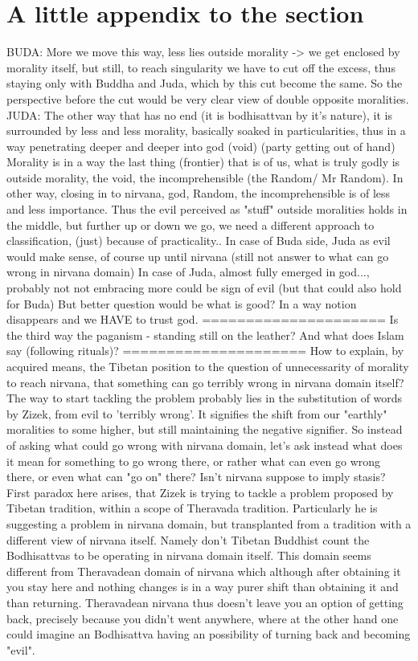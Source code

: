 \documentclass[10pt]{book}
\begin{document}
\section{A little appendix to the section}
BUDA: More we move this way, less lies outside morality -> we get enclosed by morality itself, but still, to reach singularity we have to cut off the excess, thus staying only with Buddha and Juda, which by this cut become the same. So the perspective before the cut would be very clear view of double opposite moralities.
JUDA: The other way that has no end (it is bodhisattvan by it's nature), it is surrounded by less and less morality, basically soaked in particularities, thus in a way penetrating deeper and deeper into god (void) (party getting out of hand)
Morality is in a way the last thing (frontier) that is of us, what is truly godly is outside morality, the void, the incomprehensible (the Random/ Mr Random). In other way, closing in to nirvana, god, Random, the incomprehensible is of less and less importance.
Thus the evil perceived as "stuff" outside moralities holds in the middle, but further up or down we go, we need a different approach to classification, (just) because of practicality.. In case of Buda side, Juda as evil would make sense, of course up until nirvana (still not answer to what can go wrong in nirvana domain) In case of Juda, almost fully emerged in god..., probably not not embracing more could be sign of evil (but that could also hold for Buda) But better question would be what is good? In a way notion disappears and we HAVE to trust god.
=====================
Is the third way the paganism - standing still on the leather? And what does Islam say (following rituals)?
=====================
How to explain, by acquired means, the Tibetan position to the question of unnecessarity of morality to reach nirvana, that something can go terribly wrong in nirvana domain itself?
The way to start tackling the problem probably lies in the substitution of words by Zizek, from evil to 'terribly wrong'. It signifies the shift from our "earthly" moralities to some higher, but still maintaining the negative signifier. So instead of asking what could go wrong with nirvana domain, let's ask instead what does it mean for something to go wrong there, or rather what can even go wrong there, or even what can "go on" there? Isn't nirvana suppose to imply stasis?
First paradox here arises, that Zizek is trying to tackle a problem proposed by Tibetan tradition, within a scope of Theravada tradition. Particularly he is suggesting a problem in nirvana domain, but transplanted from a tradition with a different view of nirvana itself. Namely don't Tibetan Buddhist count the Bodhisattvas to be operating in nirvana domain itself. This domain seems different from Theravadean domain of nirvana which although after obtaining it you stay here and nothing changes is in a way purer shift than obtaining it and than returning. Theravadean nirvana thus doesn't leave you an option of getting back, precisely because you didn't went anywhere, where at the other hand one could imagine an Bodhisattva having an possibility of turning back and becoming "evil".
\end{document}
